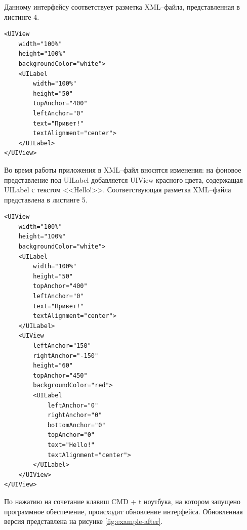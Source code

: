 Данному интерфейсу соответствует разметка XML--файла, представленная в листинге 4. 

\begin{lstlisting}[caption={Разметка XML--файла до внесения изменений}]
<UIView
    width="100%"
    height="100%"
    backgroundColor="white">
    <UILabel
        width="100%"
        height="50"
        topAnchor="400"
        leftAnchor="0"
        text="Привет!"
        textAlignment="center">
    </UILabel>
</UIView>
\end{lstlisting}

Во время работы приложения в XML--файл вносятся изменения: на фоновое представление под UILabel добавляется UIView красного цвета, содержащая UILabel с текстом <<Hello!>>. Соответствующая разметка XML--файла представлена в листинге 5. 

\begin{lstlisting}[caption={Разметка XML--файла после внесения изменений}]
<UIView
    width="100%"
    height="100%"
    backgroundColor="white">
    <UILabel
        width="100%"
        height="50"
        topAnchor="400"
        leftAnchor="0"
        text="Привет!"
        textAlignment="center">
    </UILabel>
    <UIView
        leftAnchor="150"
        rightAnchor="-150"
        height="60"
        topAnchor="450"
        backgroundColor="red">
        <UILabel
            leftAnchor="0"
            rightAnchor="0"
            bottomAnchor="0"
            topAnchor="0"
            text="Hello!"
            textAlignment="center">
        </UILabel>
    </UIView>
</UIView>
\end{lstlisting}

По нажатию на сочетание клавиш CMD + t ноутбука, на котором запущено программное обеспечение, происходит обновление интерфейса. 
Обновленная версия представлена на рисунке \ref{fig:example-after}.

